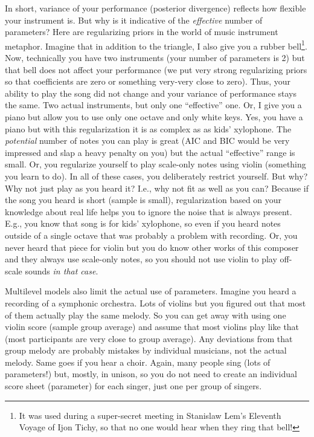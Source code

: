 \documentclass[
]{book}
\begin{document}
In short, variance of your performance (posterior divergence) reflects how flexible your instrument is. But why is it indicative of the \emph{effective} number of parameters? Here are regularizing priors in the world of music instrument metaphor. Imagine that in addition to the triangle, I also give you a rubber bell\footnote{It was used during a super-secret meeting in Stanislaw Lem's Eleventh Voyage of Ijon Tichy, so that no one would hear when they ring that bell!}. Now, technically you have two instruments (your number of parameters is 2) but that bell does not affect your performance (we put very strong regularizing priors so that coefficients are zero or something very-very close to zero). Thus, your ability to play the song did not change and your variance of performance stays the same. Two actual instruments, but only one ``effective'' one. Or, I give you a piano but allow you to use only one octave and only white keys. Yes, you have a piano but with this regularization it is as complex as as kids' xylophone. The \emph{potential} number of notes you can play is great (AIC and BIC would be very impressed and slap a heavy penalty on you) but the actual ``effective'' range is small. Or, you regularize yourself to play scale-only notes using violin (something you learn to do). In all of these cases, you deliberately restrict yourself. But why? Why not just play as you heard it? I.e., why not fit as well as you can? Because if the song you heard is short (sample is small), regularization based on your knowledge about real life helps you to ignore the noise that is always present. E.g., you know that song is for kids' xylophone, so even if you heard notes outside of a single octave that was probably a problem with recording. Or, you never heard that piece for violin but you do know other works of this composer and they always use scale-only notes, so you should not use violin to play off-scale sounds \emph{in that case}.

Multilevel models also limit the actual use of parameters. Imagine you heard a recording of a symphonic orchestra. Lots of violins but you figured out that most of them actually play the same melody. So you can get away with using one violin score (sample group average) and assume that most violins play like that (most participants are very close to group average). Any deviations from that group melody are probably mistakes by individual musicians, not the actual melody. Same goes if you hear a choir. Again, many people sing (lots of parameters!) but, mostly, in unison, so you do not need to create an individual score sheet (parameter) for each singer, just one per group of singers.
\end{document}
